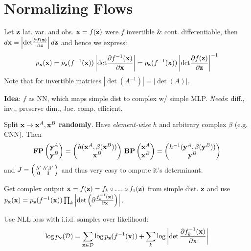 \section{Normalizing Flows}
Let \(\vb{z}\) lat. var. and obs. \(\vb{x} = f(\vb{z})\) were \(f\) invertible \& cont. differentiable, then \(d\vb{x} = \left|\text{det}\frac{\partial f(\vb{z})}{\partial \vb{z}}\right|d\vb{z}\) and hence we express:
\[p_{\vb{x}}(\vb{x}) = p_{\vb{z}}(f^{-1}(\vb{x}))\left|\text{det}\frac{\partial f^{-1}(\vb{x})}{\partial \vb{x}}\right| = p_{\vb{z}}(f^{-1}(\vb{x}))\left|\text{det}\frac{\partial f(\vb{z})}{\partial \vb{z}}\right|^{-1}\]
Note that for invertible matrices \(|\det(A^{-1})| = |\det(A)|\).

\textbf{Idea}: \(f\) as NN, which maps simple dist to complex w/ simple MLP. \textit{Needs}: diff., inv., preserve dim., Jac. comp. efficient.

\begin{definition}
    Split \(\vb{x} \to \vb{x}^A, \vb{x}^B\) \textbf{randomly}. Have \textit{element-wise} \(h\) and arbitrary complex \(\beta\) (e.g. CNN). Then
    \[\textbf{FP}\begin{pmatrix}
        \vb{y}^A \\ \vb{y}^B
    \end{pmatrix} = \begin{pmatrix}
        h(\vb{x}^A, \beta(\vb{x}^B)) \\ \vb{x}^B
    \end{pmatrix} \,
    \textbf{BP} \begin{pmatrix}
        \vb{x}^A \\ \vb{x}^B
    \end{pmatrix} = \begin{pmatrix}
        h^{-1}(\vb{y}^A, \beta(\vb{y}^B)) \\ \vb{y}^B
    \end{pmatrix}\]
    and \(J = \left(\begin{smallmatrix}
        h' & h'\beta' \\ \vb{0} &\vb{I}
    \end{smallmatrix}\right)\) and thus very easy to ompute it's determinant.
\end{definition}

\begin{definition}[Flow]
    Get complex output
    \(\vb{x} = f(\vb{z}) = f_k \circ \ldots \circ f_1(\vb{z})\) from simple dist. \(\vb{z}\) and use \(p_{\vb{x}}(\vb{x}) = p_{\vb{z}}(f^{-1}(\vb{x})) \prod_k \left|\det\left(\partial \frac{f_k^{-1}(\vb{x})}{\partial \vb{x}}\right)\right|\).
\end{definition}

\begin{definition}[Training]
    Use NLL loss with i.i.d. samples over likelihood:
    \[\log p_{\vb{x}}(\mathcal D) = \sum_{\vb{x} \in \mathcal D} \log p_{\vb{z}}(f^{-1}(\vb{x})) + \sum_k \log \left|\det \frac{\partial f_k^{-1}(\vb{x})}{\partial \vb{x}}\right|\]
\end{definition}

